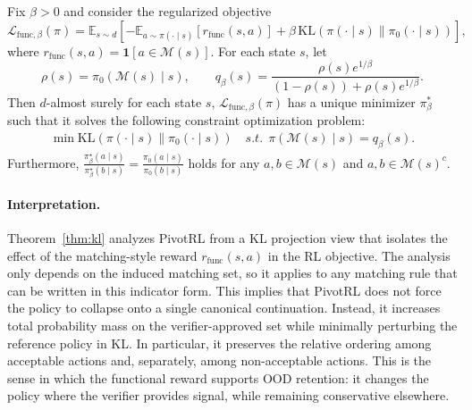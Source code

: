 \begin{theorem}%
\label{thm:kl}
Fix $\beta>0$ and consider the regularized objective
\[
\mathcal{L}_{\mathrm{func},\beta}(\pi)
=
\mathbb{E}_{s\sim d}
\left[
-
\mathbb{E}_{a\sim\pi(\cdot\mid s)}[r_{\mathrm{func}}(s,a)]
+
\beta\,\mathrm{KL}(\pi(\cdot\mid s)\|\pi_0(\cdot\mid s))
\right],
\]
where $r_{\mathrm{func}}(s,a)=\mathbf{1}[a\in\mathcal{M}(s)]$. For each state $s$, let
\[
\rho(s)=\pi_0(\mathcal{M}(s)\mid s),
\qquad
q_\beta(s)=\frac{\rho(s)e^{1/\beta}}{(1-\rho(s))+\rho(s)e^{1/\beta}}.
\]
Then $d$-almost surely for each state $s$, $\mathcal{L}_{\mathrm{func},\beta}(\pi)$ has a unique minimizer $\pi_\beta^*$ such that it solves the following constraint optimization problem:
\begin{align*}
    \min \mathrm{KL}(\pi(\cdot\mid s)\|\pi_0(\cdot\mid s)) \quad s.t. ~~ \pi(\mathcal{M}(s)\mid s)=q_\beta(s).
\end{align*}
Furthermore, $\frac{\pi_\beta^\star(a\mid s)}{\pi_\beta^\star(b\mid s)}
= \frac{\pi_0(a\mid s)}{\pi_0(b\mid s)}$ holds for any $a,b \in \mathcal{M}(s)$ and $a,b \in \mathcal{M}(s)^c$.
\end{theorem}

\paragraph{Interpretation.}
Theorem~\ref{thm:kl} analyzes PivotRL from a KL projection view that isolates the effect of the matching-style reward $r_{\mathrm{func}}(s,a)$ in the RL objective.
The analysis only depends on the induced matching set, so it applies to any matching rule that can be written in this indicator form.
This implies that PivotRL does not force the policy to collapse onto a single canonical continuation. Instead, it increases total probability mass on the verifier-approved set while minimally perturbing the reference policy in KL. In particular, it preserves the relative ordering among acceptable actions and, separately, among non-acceptable actions. This is the sense in which the functional reward supports OOD retention: it changes the policy where the verifier provides signal, while remaining conservative elsewhere.

